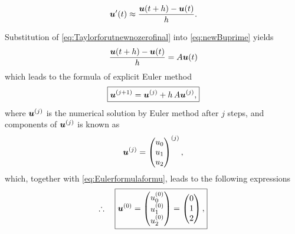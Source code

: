 \documentclass[12pt]{article}
\begin{document}
\begin{enumerate}[i)]
\begin{observationboxed}
\begin{align}
{				      {\boldsymbol{\mathnormal u}}'(t) 
				      \approx \frac{{\boldsymbol{\mathnormal u}}(t+h) - {\boldsymbol{\mathnormal u}}(t)}{h}.
			      }
		      \end{align}
	      \end{observationboxed}
	      Substitution of 
	      \eqref{eq:Taylorforutnewnozerofinal}
	      into \eqref{eq:newBuprime} yields
	      \begin{align}
		      \frac{{\boldsymbol{\mathnormal u}}(t+h) - {\boldsymbol{\mathnormal u}}(t)}{h}
		      = A{\boldsymbol{\mathnormal u}}(t)
	      \end{align}
	      which leads to the formula of explicit Euler method 
	      \begin{align}
		      \label{eq:Eulerformulaformu}
		      \boxed{
			      {\boldsymbol{\mathnormal u}}^{(j+1)} = {\boldsymbol{\mathnormal u}}^{(j)} + h\,A{\boldsymbol{\mathnormal u}}^{(j)},
		      }
	      \end{align}
	      where ${\boldsymbol{\mathnormal u}}^{(j)}$ is the numerical solution by
	      Euler method after $j$ steps,
	      and components of ${\boldsymbol{\mathnormal u}}^{(j)}$ is known as 
	      \begin{align}
		      {\boldsymbol{\mathnormal u}}^{(j)}
		      = 
		      \begin{pmatrix} 
			      u_0 \\u_1 \\u_2
		      \end{pmatrix}^{(j)},
	      \end{align}
	      which, together with 
	      \eqref{eq:Eulerformulaformu},
	      leads to the following expressions
	      \begin{align}
		      \therefore\quad
		      \boxed{
			      \begin{aligned}
				      \Bu^{(0)} & =
				      \begin{pmatrix} 
					      u_0^{(0)} \\u_1^{(0)} \\u_2^{(0)}
				      \end{pmatrix}
				      =
				      \begin{pmatrix}
					      0 \\1\\2
				      \end{pmatrix},              \\

\end{aligned}}
\end{align}
\end{enumerate}
\end{document}
